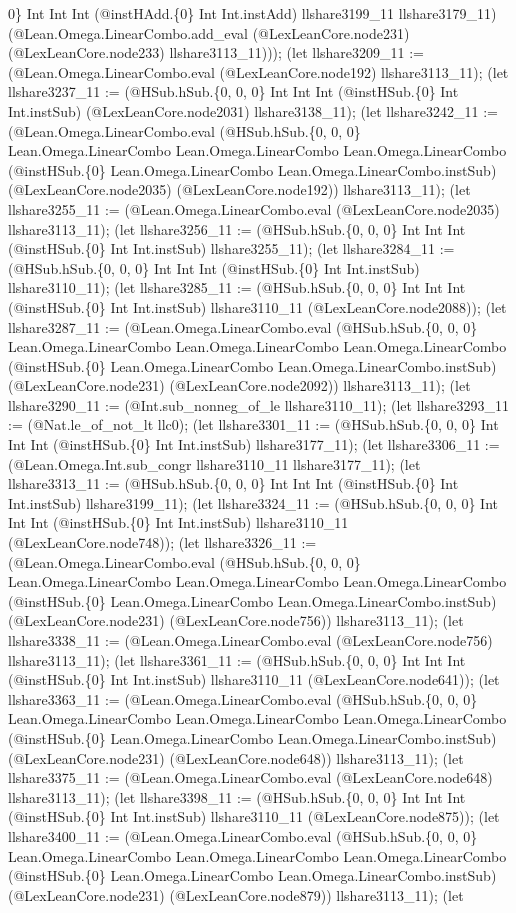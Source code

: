 \documentclass[11pt]{article}
\begin{document}
0\} Int Int Int (@instHAdd.\{0\} Int Int.instAdd) llshare3199\_11 llshare3179\_11) (@Lean.Omega.LinearCombo.add\_eval (@LexLeanCore.node231) (@LexLeanCore.node233) llshare3113\_11))); (let llshare3209\_11 := (@Lean.Omega.LinearCombo.eval (@LexLeanCore.node192) llshare3113\_11); (let llshare3237\_11 := (@HSub.hSub.\{0, 0, 0\} Int Int Int (@instHSub.\{0\} Int Int.instSub) (@LexLeanCore.node2031) llshare3138\_11); (let llshare3242\_11 := (@Lean.Omega.LinearCombo.eval (@HSub.hSub.\{0, 0, 0\} Lean.Omega.LinearCombo Lean.Omega.LinearCombo Lean.Omega.LinearCombo (@instHSub.\{0\} Lean.Omega.LinearCombo Lean.Omega.LinearCombo.instSub) (@LexLeanCore.node2035) (@LexLeanCore.node192)) llshare3113\_11); (let llshare3255\_11 := (@Lean.Omega.LinearCombo.eval (@LexLeanCore.node2035) llshare3113\_11); (let llshare3256\_11 := (@HSub.hSub.\{0, 0, 0\} Int Int Int (@instHSub.\{0\} Int Int.instSub) llshare3255\_11); (let llshare3284\_11 := (@HSub.hSub.\{0, 0, 0\} Int Int Int (@instHSub.\{0\} Int Int.instSub) llshare3110\_11); (let llshare3285\_11 := (@HSub.hSub.\{0, 0, 0\} Int Int Int (@instHSub.\{0\} Int Int.instSub) llshare3110\_11 (@LexLeanCore.node2088)); (let llshare3287\_11 := (@Lean.Omega.LinearCombo.eval (@HSub.hSub.\{0, 0, 0\} Lean.Omega.LinearCombo Lean.Omega.LinearCombo Lean.Omega.LinearCombo (@instHSub.\{0\} Lean.Omega.LinearCombo Lean.Omega.LinearCombo.instSub) (@LexLeanCore.node231) (@LexLeanCore.node2092)) llshare3113\_11); (let llshare3290\_11 := (@Int.sub\_nonneg\_of\_le llshare3110\_11); (let llshare3293\_11 := (@Nat.le\_of\_not\_lt llc0); (let llshare3301\_11 := (@HSub.hSub.\{0, 0, 0\} Int Int Int (@instHSub.\{0\} Int Int.instSub) llshare3177\_11); (let llshare3306\_11 := (@Lean.Omega.Int.sub\_congr llshare3110\_11 llshare3177\_11); (let llshare3313\_11 := (@HSub.hSub.\{0, 0, 0\} Int Int Int (@instHSub.\{0\} Int Int.instSub) llshare3199\_11); (let llshare3324\_11 := (@HSub.hSub.\{0, 0, 0\} Int Int Int (@instHSub.\{0\} Int Int.instSub) llshare3110\_11 (@LexLeanCore.node748)); (let llshare3326\_11 := (@Lean.Omega.LinearCombo.eval (@HSub.hSub.\{0, 0, 0\} Lean.Omega.LinearCombo Lean.Omega.LinearCombo Lean.Omega.LinearCombo (@instHSub.\{0\} Lean.Omega.LinearCombo Lean.Omega.LinearCombo.instSub) (@LexLeanCore.node231) (@LexLeanCore.node756)) llshare3113\_11); (let llshare3338\_11 := (@Lean.Omega.LinearCombo.eval (@LexLeanCore.node756) llshare3113\_11); (let llshare3361\_11 := (@HSub.hSub.\{0, 0, 0\} Int Int Int (@instHSub.\{0\} Int Int.instSub) llshare3110\_11 (@LexLeanCore.node641)); (let llshare3363\_11 := (@Lean.Omega.LinearCombo.eval (@HSub.hSub.\{0, 0, 0\} Lean.Omega.LinearCombo Lean.Omega.LinearCombo Lean.Omega.LinearCombo (@instHSub.\{0\} Lean.Omega.LinearCombo Lean.Omega.LinearCombo.instSub) (@LexLeanCore.node231) (@LexLeanCore.node648)) llshare3113\_11); (let llshare3375\_11 := (@Lean.Omega.LinearCombo.eval (@LexLeanCore.node648) llshare3113\_11); (let llshare3398\_11 := (@HSub.hSub.\{0, 0, 0\} Int Int Int (@instHSub.\{0\} Int Int.instSub) llshare3110\_11 (@LexLeanCore.node875)); (let llshare3400\_11 := (@Lean.Omega.LinearCombo.eval (@HSub.hSub.\{0, 0, 0\} Lean.Omega.LinearCombo Lean.Omega.LinearCombo Lean.Omega.LinearCombo (@instHSub.\{0\} Lean.Omega.LinearCombo Lean.Omega.LinearCombo.instSub) (@LexLeanCore.node231) (@LexLeanCore.node879)) llshare3113\_11); (let 
\end{document}
